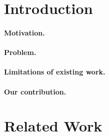 
\section{Introduction}
\label{sec:intro}

\paragraph{Motivation.}

\paragraph{Problem.}

\paragraph{Limitations of existing work.}

\paragraph{Our contribution.}

\section{Related Work}
\label{sec:related}



